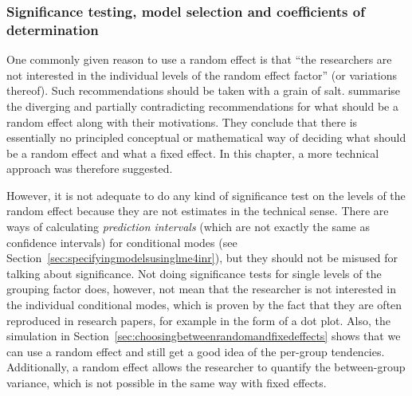 \documentclass[a4paper,12pt]{article}
\begin{document}
\subsubsection{Significance testing, model selection and coefficients of determination}
\label{sec:significancetestingandcoefficientsofdetermination}

One commonly given reason to use a random effect is that ``the researchers are not interested in the individual levels of the random effect factor'' (or variations thereof).
Such recommendations should be taken with a grain of salt.
\citet[245--247]{GelmanHill2006} summarise the diverging and partially contradicting recommendations for what should be a random effect along with their motivations.
They conclude that there is essentially no principled conceptual or mathematical way of deciding what should be a random effect and what a fixed effect.
In this chapter, a more technical approach was therefore suggested.

However, it is not adequate to do any kind of significance test on the levels of the random effect because they are not estimates in the technical sense.
There are ways of calculating \textit{prediction intervals} (which are not exactly the same as confidence intervals) for conditional modes (see Section~\ref{sec:specifyingmodelsusinglme4inr}), but they should not be misused for talking about significance.
Not doing significance tests for single levels of the grouping factor does, however, not mean that the researcher is not interested in the individual conditional modes, which is proven by the fact that they are often reproduced in research papers, for example in the form of a dot plot.
Also, the simulation in Section~\ref{sec:choosingbetweenrandomandfixedeffects} shows that we can use a random effect and still get a good idea of the per-group tendencies.
Additionally, a random effect allows the researcher to quantify the between-group variance, which is not possible in the same way with fixed effects.
\end{document}
